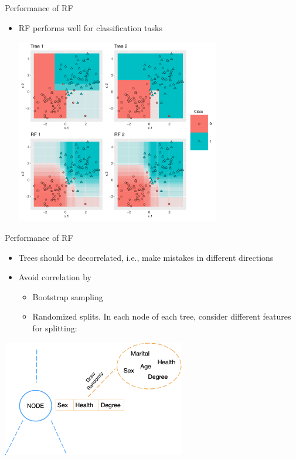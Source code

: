 \documentclass[11pt,compress,t,notes=noshow, xcolor=table]{beamer}
\begin{document}
\begin{vbframe}{Performance of RF}
\begin{itemize}
\item \small RF performs well for classification tasks
\begin{center}
 \includegraphics[width = 0.7\textwidth]{slides/forests/figure/nutshell_classif_combined_1.pdf}
\end{center}
\end{itemize}



\end{vbframe}

\begin{vbframe}{Performance of RF}
\begin{itemize} 
\item \small Trees should be decorrelated, i.e., make mistakes in different directions
\item \small Avoid correlation by
    \begin{itemize}
        \item \small Bootstrap sampling 
        \item \small Randomized splits. In each node of each tree, consider different features for splitting:
    \end{itemize}
\end{itemize}

\vspace{0.5cm}
\begin{center}
  \includegraphics[width = 0.6\textwidth]{slides/forests/figure_man/nutshell-randomforest-random-split.png}
\end{center}




\end{vbframe}
\end{document}
